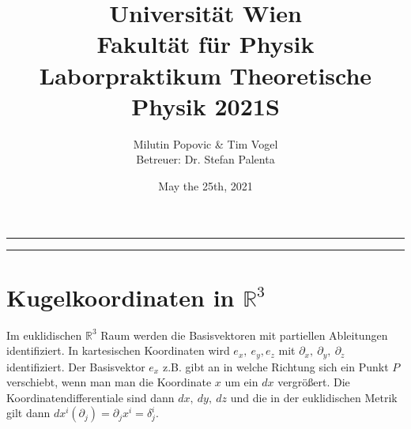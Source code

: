 \documentclass[a4paper]{article}
\title{Universität Wien\\ Fakultät für Physik\\
\vspace{1.25cm}Laborpraktikum Theoretische Physik 2021S \\
}
\author{Milutin Popovic \& Tim Vogel \vspace{1cm}\\ Betreuer: Dr. Stefan
Palenta}
\date{May the 25th, 2021}
\begin{document}
\maketitle
\noindent\rule[0.5ex]{\linewidth}{1pt}
\begin{abstract}
\end{abstract}
\noindent\rule[0.5ex]{\linewidth}{1pt}

\tableofcontents
\section{Kugelkoordinaten in $\mathbb{R}^3$}
Im euklidischen $\mathbb{R}^3$ Raum werden die Basisvektoren mit partiellen
Ableitungen identifiziert. In kartesischen Koordinaten wird $e_x,\ e_y, e_z$
mit $\partial _x,\ \partial _y,\ \partial _z$ identifiziert. Der
Basisvektor $e_x$ z.B. gibt an in welche Richtung sich ein Punkt $P$
verschiebt, wenn man man die Koordinate $x$ um ein $dx$ vergrößert. Die
Koordinatendifferentiale sind dann $dx,\ dy,\ dz$ und die in der euklidischen
Metrik gilt dann $dx^i(\partial _j) = \partial_j x^i = \delta^i_j$.
\end{document}
